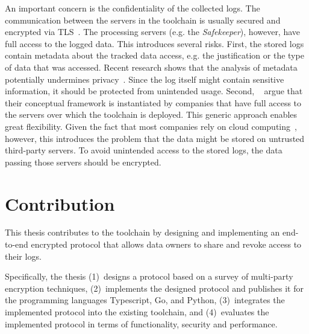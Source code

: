 \documentclass[../main.tex]{subfiles}
\begin{document}
An important concern is the confidentiality of the collected logs.
The communication between the servers in the toolchain is usually secured and encrypted via TLS~\cite{Rescorla2000}.
The processing servers (e.g. the \emph{Safekeeper}), however, have full access to the logged data.
This introduces several risks.
First, the stored logs contain metadata about the tracked data access, e.g. the justification or the type of data that was accessed.
Recent research shows that the analysis of metadata potentially undermines privacy~\cite{Greschbach2012,Mayer2016}.
Since the log itself might contain sensitive information, it should be protected from unintended usage.
Second, \citeauthor{Zieglmeier2021}~\cite{Zieglmeier2021} argue that their conceptual framework is instantiated by companies that have full access to the servers over which the toolchain is deployed.
This generic approach enables great flexibility.
Given the fact that most companies rely on cloud computing~\cite{Weber2021}, however, this introduces the problem that the data might be stored on untrusted third-party servers.
To avoid unintended access to the stored logs, the data passing those servers should be encrypted.

\section{Contribution}

This thesis contributes to the toolchain by designing and implementing an end-to-end encrypted protocol that allows data owners to share and revoke access to their logs.

Specifically, the thesis 
(1)~designs a protocol based on a survey of multi-party encryption techniques,
(2)~implements the designed protocol and publishes it for the programming languages Typescript, Go, and Python,
(3)~integrates the implemented protocol into the existing toolchain, and 
(4)~evaluates the implemented protocol in terms of functionality, security and performance.
\end{document}

